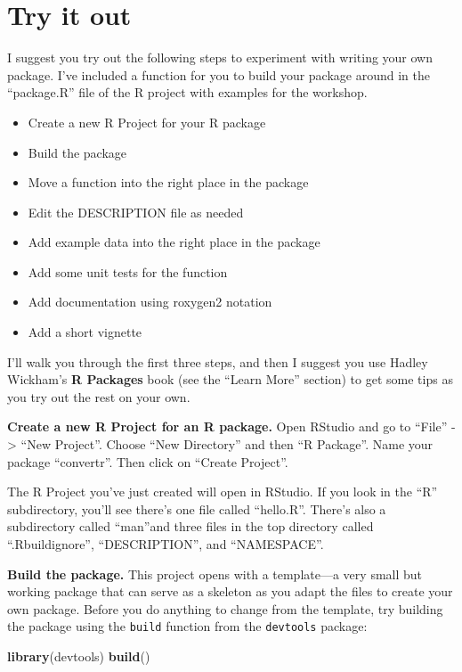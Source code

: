 \documentclass[]{tufte-book}
\newenvironment{Shaded}{}{}
\newcommand{\KeywordTok}[1]{\textcolor[rgb]{0.00,0.44,0.13}{\textbf{#1}}}
\newcommand{\NormalTok}[1]{#1}
\providecommand{\tightlist}{%
  \setlength{\itemsep}{0pt}\setlength{\parskip}{0pt}}
\begin{document}
\hypertarget{try-it-out}{%
\section{Try it out}\label{try-it-out}}

I suggest you try out the following steps to experiment with
writing your own package. I've included a function for you to build
your package around in the ``package.R'' file of the R project with
examples for the workshop.

\begin{itemize}
\tightlist
\item
  Create a new R Project for your R package
\item
  Build the package
\item
  Move a function into the right place in the package
\item
  Edit the DESCRIPTION file as needed
\item
  Add example data into the right place in the package
\item
  Add some unit tests for the function
\item
  Add documentation using roxygen2 notation
\item
  Add a short vignette
\end{itemize}

I'll walk you through the first three steps, and then I suggest you use
Hadley Wickham's \textbf{R Packages} book (see the ``Learn More'' section) to
get some tips as you try out the rest on your own.

\textbf{Create a new R Project for an R package.} Open RStudio and go to ``File'' -\textgreater{}
``New Project''. Choose ``New Directory'' and then ``R Package''. Name your package
``convertr''. Then click on ``Create Project''.

The R Project you've just created will open in RStudio. If you look in the ``R''
subdirectory, you'll see there's one file called ``hello.R''. There's also a
subdirectory called ``man''and three files in the top directory called
``.Rbuildignore'', ``DESCRIPTION'', and ``NAMESPACE''.

\textbf{Build the package.} This project opens with a template---a very small but working package that can
serve as a skeleton as you adapt the files to create your own package. Before you
do anything to change from the template, try building the package using the
\texttt{build} function from the \texttt{devtools} package:

\begin{Shaded}
\begin{Highlighting}[]
\KeywordTok{library}\NormalTok{(devtools)}
\KeywordTok{build}\NormalTok{()}
\end{Highlighting}
\end{Shaded}
\end{document}
